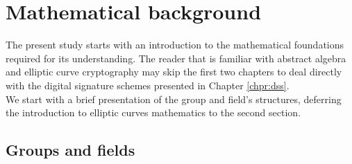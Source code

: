 \chapter{Mathematical background}
\label{chpr:math}
The present study starts with an introduction to the mathematical foundations required for its understanding. The reader that is familiar with abstract algebra and elliptic curve cryptography may skip the first two chapters to deal directly with the digital signature schemes presented in Chapter \ref{chpr:dss}.
\\
We start with a brief presentation of the group and field's structures, deferring the introduction to elliptic curves mathematics to the second section.

\bigskip

\section{Groups and fields}
\label{groupsfields}

